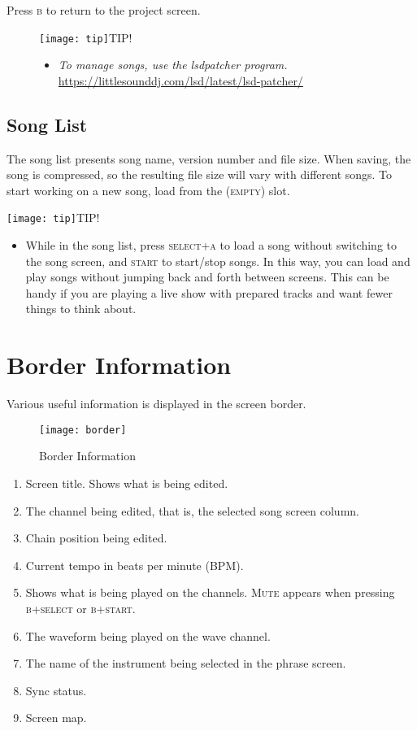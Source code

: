 Press \textsc{b} to return to the project screen.

\begin{figure}[hbtp]
	\texttt{[image: tip]}TIP!
	\begin{itemize}
		\item \textit{To manage songs, use the lsdpatcher program.} \url{https://littlesounddj.com/lsd/latest/lsd-patcher/}
	\end{itemize}
\end{figure}

\subsection{Song List}

The song list presents song name, version number and file size. When saving, the song is compressed, so the resulting file size will vary with different songs. To start working on a new song, load from the \textsc{(empty)} slot.

\texttt{[image: tip]}TIP!
\begin{itemize}
    \item{While in the song list, press \textsc{select+a} to load a song without switching to the song screen, and \textsc{start} to start/stop songs. In this way, you can load and play songs without jumping back and forth between screens. This can be handy if you are playing a live show with prepared tracks and want fewer things to think about.}
\end{itemize}

\section{Border Information}

Various useful information is displayed in the screen border.

\begin{figure}[htpb]
	\begin{center}
	\texttt{[image: border]}
	\end{center}
	\caption{Border Information}
	\label{fig:border}
\end{figure}

\begin{enumerate}
\item Screen title. Shows what is being edited.
\item The channel being edited, that is, the selected song screen column.
\item Chain position being edited.
\item Current tempo in beats per minute (BPM).
\item Shows what is being played on the channels. \textsc{Mute} appears when pressing \textsc{b+select} or \textsc{b+start}.
\item The waveform being played on the wave channel.
\item The name of the instrument being selected in the phrase screen.
\item Sync status.
\item Screen map.
\end{enumerate}


